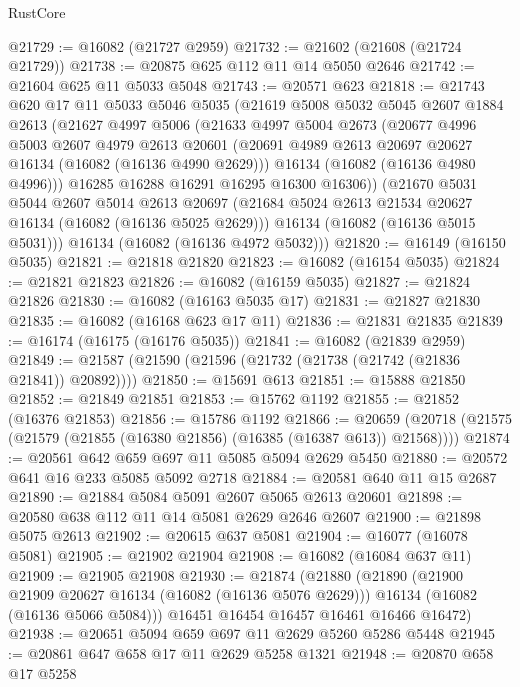 \begin{lexlean}{RustCore}
\begin{coremodule}
@21729 := @16082 (@21727 @2959)
@21732 := @21602 (@21608 (@21724 @21729))
@21738 := @20875 @625 @112 @11 @14 @5050 @2646
@21742 := @21604 @625 @11 @5033 @5048
@21743 := @20571 @623
@21818 := @21743
    @620
    @17
    @11
    @5033
    @5046
    @5035
    (@21619
      @5008
      @5032
      @5045
      @2607
      @1884
      @2613
      (@21627
        @4997
        @5006
        (@21633
          @4997
          @5004
          @2673
          (@20677
            @4996
            @5003
            @2607
            @4979
            @2613
            @20601
            (@20691 @4989 @2613 @20697 @20627 @16134 (@16082 (@16136 @4990 @2629)))
            @16134
            (@16082 (@16136 @4980 @4996)))
          @16285
          @16288
          @16291
          @16295
          @16300
          @16306))
      (@21670
        @5031
        @5044
        @2607
        @5014
        @2613
        @20697
        (@21684 @5024 @2613 @21534 @20627 @16134 (@16082 (@16136 @5025 @2629)))
        @16134
        (@16082 (@16136 @5015 @5031)))
      @16134
      (@16082 (@16136 @4972 @5032)))
@21820 := @16149 (@16150 @5035)
@21821 := @21818 @21820
@21823 := @16082 (@16154 @5035)
@21824 := @21821 @21823
@21826 := @16082 (@16159 @5035)
@21827 := @21824 @21826
@21830 := @16082 (@16163 @5035 @17)
@21831 := @21827 @21830
@21835 := @16082 (@16168 @623 @17 @11)
@21836 := @21831 @21835
@21839 := @16174 (@16175 (@16176 @5035))
@21841 := @16082 (@21839 @2959)
@21849 := @21587 (@21590 (@21596 (@21732 (@21738 (@21742 (@21836 @21841)) @20892))))
@21850 := @15691 @613
@21851 := @15888 @21850
@21852 := @21849 @21851
@21853 := @15762 @1192
@21855 := @21852 (@16376 @21853)
@21856 := @15786 @1192
@21866 := @20659 (@20718 (@21575 (@21579 (@21855 (@16380 @21856) (@16385 (@16387 @613)) @21568))))
@21874 := @20561 @642 @659 @697 @11 @5085 @5094 @2629 @5450
@21880 := @20572 @641 @16 @233 @5085 @5092 @2718
@21884 := @20581 @640 @11 @15 @2687
@21890 := @21884 @5084 @5091 @2607 @5065 @2613 @20601
@21898 := @20580 @638 @112 @11 @14 @5081 @2629 @2646 @2607
@21900 := @21898 @5075 @2613
@21902 := @20615 @637 @5081
@21904 := @16077 (@16078 @5081)
@21905 := @21902 @21904
@21908 := @16082 (@16084 @637 @11)
@21909 := @21905 @21908
@21930 := @21874
    (@21880
      (@21890
        (@21900 @21909 @20627 @16134 (@16082 (@16136 @5076 @2629)))
        @16134
        (@16082 (@16136 @5066 @5084)))
      @16451
      @16454
      @16457
      @16461
      @16466
      @16472)
@21938 := @20651 @5094 @659 @697 @11 @2629 @5260 @5286 @5448
@21945 := @20861 @647 @658 @17 @11 @2629 @5258 @1321
@21948 := @20870 @658 @17 @5258

\end{coremodule}
\end{lexlean}
